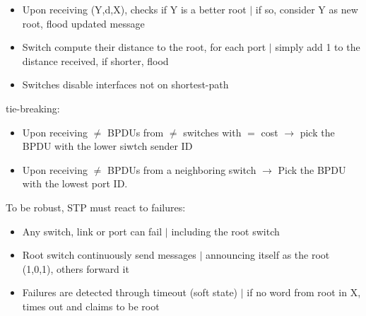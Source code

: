\documentclass[a4paper, fontsize=8pt, landscape, DIV=1]{scrartcl}
\begin{document}
\begin{multicols*}{4}
\begin{itemize}[noitemsep]
   			\item Upon receiving (Y,d,X), checks if Y is a better root $\vert$ if so, consider Y as new root, flood updated message 
   			\item Switch compute their distance to the root, for each port $\vert$ simply add 1 to the distance received, if shorter, flood
   			\item Switches disable interfaces not on shortest-path
   		\end{itemize}
   		tie-breaking: 
   		\vspace{-0.2cm}
   		\begin{itemize}[noitemsep]
   			\item Upon receiving $\ne$ BPDUs from $\ne$ switches with $=$ cost $\rightarrow$ pick the BPDU with the lower siwtch sender ID
   			\item Upon receiving $\ne$ BPDUs from a neighboring switch $\rightarrow$ Pick the BPDU with the lowest port ID. 
   		\end{itemize}
   		To be robust, STP must react to failures: 
   		\vspace{-0.2cm}
   		\begin{itemize}[noitemsep]
   			\item Any switch, link or port can fail $\vert$ including the root switch
   			\item Root switch continuously send messages $\vert$ announcing itself as the root (1,0,1), others forward it
   			\item Failures are detected through timeout (soft state) $\vert$ if no word from root in X, times out and claims to be root 
   		\end{itemize}

\end{multicols*}
\end{document}
